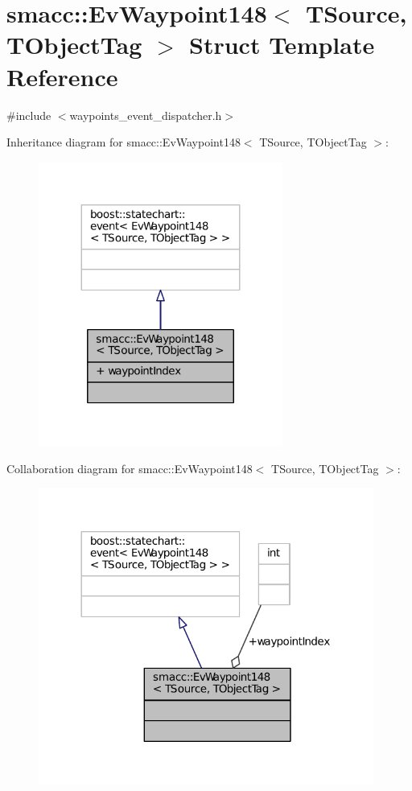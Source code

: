 \hypertarget{structsmacc_1_1EvWaypoint148}{}\section{smacc\+:\+:Ev\+Waypoint148$<$ T\+Source, T\+Object\+Tag $>$ Struct Template Reference}
\label{structsmacc_1_1EvWaypoint148}


{\ttfamily \#include $<$waypoints\+\_\+event\+\_\+dispatcher.\+h$>$}



Inheritance diagram for smacc\+:\+:Ev\+Waypoint148$<$ T\+Source, T\+Object\+Tag $>$\+:
\nopagebreak
\begin{figure}[H]
\begin{center}
\leavevmode
\includegraphics[width=227pt]{structsmacc_1_1EvWaypoint148__inherit__graph}
\end{center}
\end{figure}


Collaboration diagram for smacc\+:\+:Ev\+Waypoint148$<$ T\+Source, T\+Object\+Tag $>$\+:
\nopagebreak
\begin{figure}[H]
\begin{center}
\leavevmode
\includegraphics[width=312pt]{structsmacc_1_1EvWaypoint148__coll__graph}
\end{center}
\end{figure}
